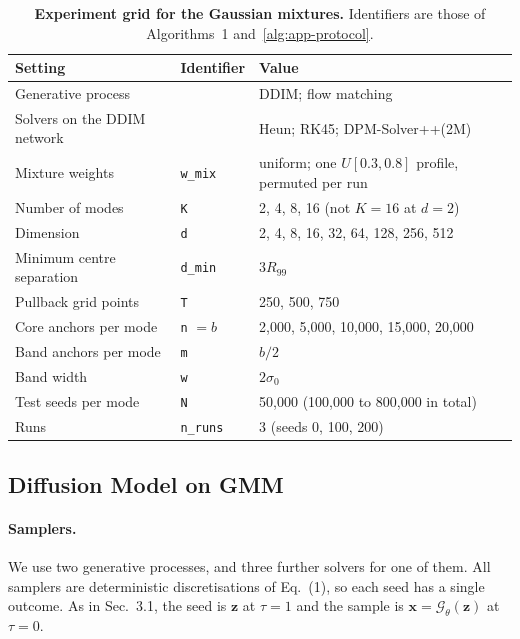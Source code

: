 \begin{table}[htbp]
\centering
\small
\caption{\textbf{Experiment grid for the Gaussian mixtures.} Identifiers are those of
Algorithms~1 and~\ref{alg:app-protocol}.}
\label{tab:app-grid}
\begin{tabular}{lll}
\toprule
Setting & Identifier & Value \\
\midrule
Generative process           &                        & DDIM; flow matching \\
Solvers on the DDIM network  &                        & Heun; RK45; DPM-Solver++(2M) \\
Mixture weights              & \texttt{w\_mix}        & uniform; one $U[0.3, 0.8]$ profile, permuted per run \\
Number of modes              & \texttt{K}             & 2, 4, 8, 16 (not $K = 16$ at $d = 2$) \\
Dimension                    & \texttt{d}             & 2, 4, 8, 16, 32, 64, 128, 256, 512 \\
Minimum centre separation    & \texttt{d\_min}        & $3R_{99}$ \\
Pullback grid points         & \texttt{T}             & 250, 500, 750 \\
Core anchors per mode        & \texttt{n} $= b$       & 2{,}000, 5{,}000, 10{,}000, 15{,}000, 20{,}000 \\
Band anchors per mode        & \texttt{m}             & $b/2$ \\
Band width                   & \texttt{w}             & $2\sigma_0$ \\
Test seeds per mode          & \texttt{N}             & 50{,}000 (100{,}000 to 800{,}000 in total) \\
Runs                         & \texttt{n\_runs}       & 3 (seeds 0, 100, 200) \\
\bottomrule
\end{tabular}
\end{table}


\subsection{Diffusion Model on GMM}
\label{app:details-diffusion}

\paragraph{Samplers.}
We use two generative processes, and three further solvers for one of them. All samplers are
deterministic discretisations of Eq.~(1), so each seed has a single outcome. As in Sec.~3.1, the
seed is $\boldsymbol{z}$ at $\tau = 1$ and the sample is
$\boldsymbol{x} = \mathcal{G}_\theta(\boldsymbol{z})$ at $\tau = 0$.

